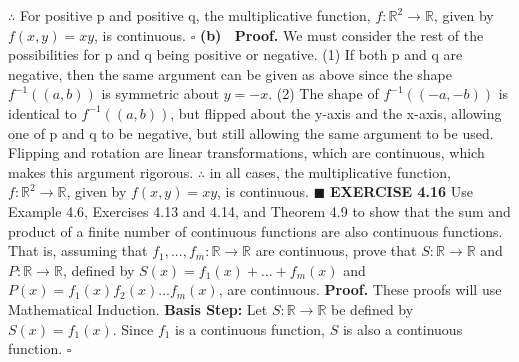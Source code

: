 \documentclass[12pt]{article}
\begin{document}
  \newline \newline
  \(\therefore\) For positive p and positive q, the multiplicative function, \(f: \mathbb{R}^2 \rightarrow \mathbb{R}\), given by \(f(x,y) = xy\), is continuous.
  \newline \(\square\) \newline
  \textbf{(b) \ Proof.}
  \newline
  We must consider the rest of the possibilities for p and q being positive or negative.
  \newline \newline
  (1) If both p and q are negative, then the same argument can be given as above since the shape \(f^{-1}((a,b))\) is symmetric about \(y=-x\).
  \newline
  (2) The shape of \(f^{-1}((-a,-b))\) is identical to \(f^{-1}((a,b))\), but flipped about the y-axis and the x-axis, allowing one of p and q to be negative, but still allowing the same argument to be used.
  \newline
  Flipping and rotation are linear transformations, which are continuous, which makes this argument rigorous.
  \newline \newline
  \(\therefore\) in all cases, the multiplicative function, \(f: \mathbb{R}^2 \rightarrow \mathbb{R}\), given by \(f(x,y) = xy\), is continuous.
  \newline \(\blacksquare\)
  \newpage
  \noindent
  \textbf{EXERCISE 4.16}
  \newline
  Use Example 4.6, Exercises 4.13 and 4.14, and Theorem 4.9 to show that the sum and product of a finite number of continuous functions are also continuous functions. That is, assuming that \(f_1,...,f_m: \mathbb{R} \rightarrow \mathbb{R}\) are continuous, prove that \(S: \mathbb{R} \rightarrow \mathbb{R}\) and \(P: \mathbb{R} \rightarrow \mathbb{R}\), defined by \(S(x) = f_1(x)+...+f_m(x)\) and \(P(x) = f_1(x)f_2(x)...f_m(x)\), are continuous.
  \newline \newline
  \textbf{Proof.}
  \newline
  These proofs will use Mathematical Induction.
  \newline
  \textbf{Basis Step:} Let \(S: \mathbb{R} \rightarrow \mathbb{R}\) be defined by \(S(x) = f_1(x)\).
  \newline
  Since \(f_1\) is a continuous function, \(S\) is also a continuous function.
  \newline \(\square\) \newline
\end{document}
